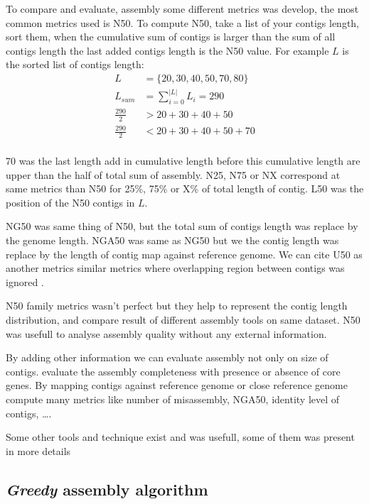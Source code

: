 \documentclass[./main.tex]{subfiles}
\begin{document}
To compare and evaluate, assembly some different metrics was develop, the most common metrics used is N50.
To compute N50, take a list of your contigs length, sort them, when the cumulative sum of contigs is larger than the sum of all contigs length the last added contigs length is the N50 value. For example $L$ is the sorted list of contigs length: 
\begin{equation}
\begin{aligned}
L &= \{20, 30, 40, 50, 70, 80\} \\
L_{sum} &= \sum\limits_{i=0}^{|L|} L_i = 290 \\
\frac{290}{2} &> 20 + 30 + 40 + 50 \\
\frac{290}{2} &< 20 + 30 + 40 + 50 + 70\\
\end{aligned}
\end{equation}

70 was the last length add in cumulative length before this cumulative length are upper than the half of total sum of assembly. N25, N75 or NX correspond at same metrics than N50 for 25\%, 75\% or X\% of total length of contig. L50 was the position of the N50 contigs in $L$.

NG50 was same thing of N50, but the total sum of contigs length was replace by the genome length. NGA50 was same as NG50 but we the contig length was replace by the length of contig map against reference genome. We can cite U50 as another metrics similar metrics where overlapping region between contigs was ignored \cite{U50}.

N50 family metrics wasn't perfect but they help to represent the contig length distribution, and compare result of different assembly tools on same dataset. N50 was usefull to analyse assembly quality without any external information.

By adding other information we can evaluate assembly not only on size of contigs. \cite{busco} evaluate the assembly completeness with presence or absence of core genes. By mapping contigs against reference genome or close reference genome \cite{quast} compute many metrics like number of misassembly, NGA50, identity level of contigs, …. 

Some other tools and technique exist and was usefull, some of them was present in more details \cite{seq_assembly_demystified}

\subsection{\textit{Greedy} assembly algorithm}
\end{document}

